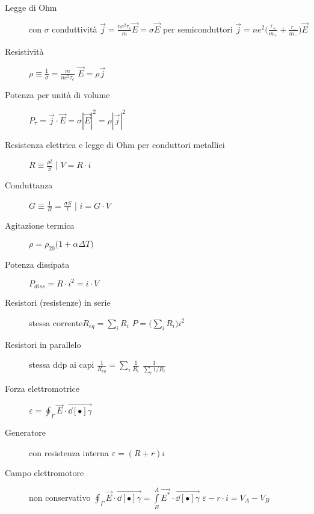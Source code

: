 \documentclass[10pt, oneside]{article}
\begin{document}
\begin{description}


\item[Legge di Ohm] con $\sigma$ conduttività \hfill $\displaystyle \vec{j} = \frac{n e^2 \tau_c}{m} \vec{E} = \sigma \vec{E}$ \qquad per semiconduttori $\vec{j} = ne^2 \big(\frac{\tau_{+}}{m_{+}} + \frac{\tau_{-}}{m_{-}}\big) \vec{E}$

\item[Resistività] \hfill $\displaystyle \rho \equiv \frac{1}{\sigma} = \frac{m}{n e^2 \tau_c}$ \qquad $\vec{E} = \rho \vec{j}$

\item[Potenza per unità di volume] \hfill $\displaystyle P_\tau = \vec{j} \cdot \vec{E} = \sigma |\vec{E}|^2 = \rho |\vec{j}|^2$

\item[Resistenza elettrica e legge di Ohm per conduttori metallici] \hfill $\displaystyle R \equiv \frac{\rho l}{S}$ \qquad | \qquad $\displaystyle V = R \cdot i$

\item[Conduttanza] \hfill $\displaystyle G \equiv \frac{1}{R} = \frac{\sigma S}{l}$ \qquad | \qquad $i = G \cdot V$

\item[Agitazione termica] \hfill $\displaystyle \rho = \rho_{20} \big(1 + \alpha \Delta T\big)$

\item[Potenza dissipata] \hfill $\displaystyle P_{diss} = R \cdot i^2 = i \cdot V$

\item[Resistori (resistenze) in serie] stessa corrente\hfill $\displaystyle R_{eq} = \sum_i R_i$ \qquad $\displaystyle P = \big(\sum_i R_i\big) i^2$

\item[Resistori in parallelo] stessa ddp ai capi \hfill $\displaystyle \frac{1}{R_{eq}} = \sum_i \frac{1}{R_i}$ \qquad $\displaystyle \frac{1}{\sum_i 1\big/R_i}$

\item[Forza elettromotrice] \hfill $\displaystyle \varepsilon = \oint_\Gamma \vec{E} \cdot \vec{\dd[•]{\gamma}}$

\item[Generatore] con resistenza interna \hfill $\displaystyle \varepsilon = (R + r) i$

\item[Campo elettromotore] non conservativo \hfill $\displaystyle \oint_\Gamma \vec{E} \cdot \vec{\dd[•]{\gamma}} = \int\limits_B^A \vec{E^\ast} \cdot \vec{\dd[•]{\gamma}}$ \qquad $\displaystyle \varepsilon - r \cdot i = V_A - V_B$

\end{description}
\end{document}
